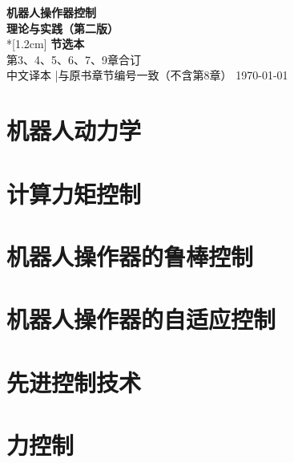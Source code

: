 \documentclass[UTF8,a4paper,12pt]{ctexbook}
\numberwithin{equation}{section}
\theoremstyle{definition}
\begin{document}
\begin{titlepage}
\begin{center}
\vspace*{2.5cm}
{\Huge\bfseries 机器人操作器控制}\\[0.8cm]
{\Large\bfseries 理论与实践（第二版）}\\*[1.2cm]
{\Large\bfseries 节选本}\\[0.5cm]
{\large 第3、4、5、6、7、9章合订}\\[2cm]
{\normalsize 中文译本 \quad|\quad 与原书章节编号一致（不含第8章）}
\vfill
{\large \today}
\end{center}
\end{titlepage}

\frontmatter
\tableofcontents
\newpage

\mainmatter

\setcounter{chapter}{2}

\chapter{机器人动力学}


\chapter{计算力矩控制}


\chapter{机器人操作器的鲁棒控制}


\chapter{机器人操作器的自适应控制}


\chapter{先进控制技术}


\setcounter{chapter}{8}
\chapter{力控制}


\backmatter
\end{document}
